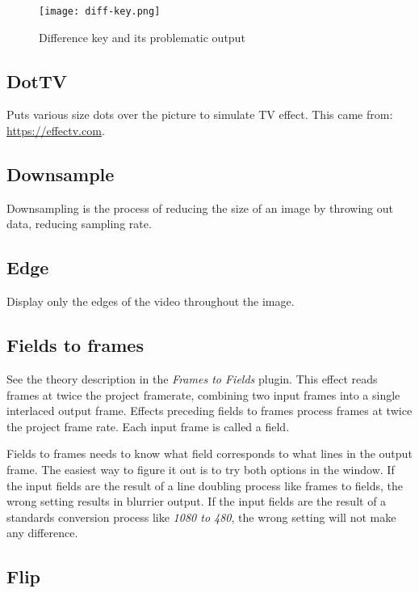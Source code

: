 \begin{figure}[htpb]
    \centering
    \texttt{[image: diff-key.png]}
    \caption{Difference key and its problematic output}
    \label{fig:diff-key}
\end{figure}

\subsection{DotTV}%
\label{sub:dottv}

Puts various size dots over the picture to simulate TV effect. This came from: {\small \url{https://effectv.com}}.

\subsection{Downsample}%
\label{sub:downsample}

Downsampling is the process of reducing the size of an image by throwing out data, reducing sampling rate.

\subsection{Edge}%
\label{sub:edge}

Display only the edges of the video throughout the image.

\subsection{Fields to frames}%
\label{sub:fields_to_frames}

See the theory description in the \textit{Frames to Fields} plugin. This effect reads frames at twice the project framerate, combining two input frames into a single interlaced output frame. Effects preceding fields to frames process frames at twice the project frame rate. Each input frame is called a field.

Fields to frames needs to know what field corresponds to what lines in the output frame. The easiest way to figure it out is to try both options in the window. If the input fields are the result of a line doubling process like frames to fields, the wrong setting results in blurrier output. If the input fields are the result of a standards conversion process like \textit{1080 to 480}, the wrong setting will not make any difference.

\subsection{Flip}%
\label{sub:flip}

